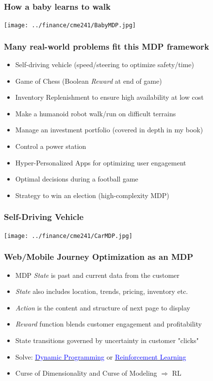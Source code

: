 \documentclass[handout]{beamer}
\begin{document}
\begin{frame}
\frametitle{How a baby learns to walk}
\texttt{[image: ../finance/cme241/BabyMDP.jpg]}
\end{frame}

\begin{frame}
\frametitle{Many real-world problems fit this MDP framework}
\pause
\begin{itemize}[<+->]
\item Self-driving vehicle (speed/steering to optimize safety/time)
\item Game of Chess (Boolean {\em Reward} at end of game)
\item Inventory Replenishment to ensure high availability at low cost
\item Make a humanoid robot walk/run on difficult terrains
\item Manage an investment portfolio (covered in depth in my book)
\item Control a power station
\item Hyper-Personalized Apps for optimizing user engagement
\item Optimal decisions during a football game
\item Strategy to win an election (high-complexity MDP)
\end{itemize}
\end{frame}

\begin{frame}
\frametitle{Self-Driving Vehicle}
\texttt{[image: ../finance/cme241/CarMDP.jpg]}
\end{frame}

\begin{frame}
\frametitle{Web/Mobile Journey Optimization as an MDP}
\pause
\begin{itemize}[<+->]
\item MDP {\em State} is past and current data from the customer
\item {\em State} also includes location, trends, pricing, inventory etc.
\item {\em Action} is the content and structure of next page to display
\item {\em Reward} function blends customer engagement and profitability
\item State transitions governed by uncertainty in customer "clicks"
\item Solve: \href{https://en.wikipedia.org/wiki/Dynamic_programming}{\underline{\textcolor{blue}{Dynamic Programming}}} or
 \href{https://en.wikipedia.org/wiki/Reinforcement_learning}{\underline{\textcolor{blue}{Reinforcement Learning}}}
\item Curse of Dimensionality and Curse of Modeling $\Rightarrow$ RL
\end{itemize}
\end{frame}
\end{document}
